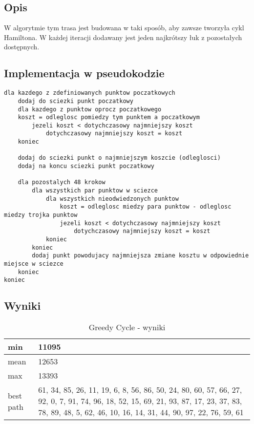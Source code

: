 \documentclass[a4paper 10pt]{article}
\begin{document}
\subsection{Opis}
W algorytmie tym trasa jest budowana w taki sposób, aby zawsze tworzyła cykl Hamiltona. W każdej iteracji dodawany jest jeden najkrótszy łuk z pozostałych dostępnych.
\subsection{Implementacja w pseudokodzie}
\begin{lstlisting}[frame=single]
dla kazdego z zdefiniowanych punktow poczatkowych
	dodaj do sciezki punkt poczatkowy
	dla kazdego z punktow oprocz poczatkowego
	koszt = odleglosc pomiedzy tym punktem a poczatkowym
		jezeli koszt < dotychczasowy najmniejszy koszt
			dotychczasowy najmniejszy koszt = koszt
	koniec
	
	dodaj do sciezki punkt o najmniejszym koszcie (odleglosci)
	dodaj na koncu sciezki punkt poczatkowy
	
	dla pozostalych 48 krokow
		dla wszystkich par punktow w sciezce
			dla wszystkich nieodwiedzonych punktow
				koszt = odleglosc miedzy para punktow - odleglosc miedzy trojka punktow
				jezeli koszt < dotychczasowy najmniejszy koszt
					dotychczasowy najmniejszy koszt = koszt
			koniec
		koniec
		dodaj punkt powodujacy najmniejsza zmiane kosztu w odpowiednie miejsce w sciezce
	koniec	
koniec

\end{lstlisting}
\subsection{Wyniki}
\begin{table}[H]
\center
\caption{Greedy Cycle - wyniki}
\label{Greedy Cycle - wyniki}
\begin{tabular}{|p{1cm}|p{14cm}|}
\hline
min       & 11095                                                                                                                                                                                                 \\ \hline
mean      & 12653                                                                                                                                                                                                 \\ \hline
max       & 13393                                                                                                                                                                                                 \\ \hline
best path & 61, 34, 85, 26, 11, 19, 6, 8, 56, 86, 50, 24, 80, 60, 57, 66, 27, 92, 0, 7, 91, 74, 96, 18, 52, 15, 69, 21, 93, 87, 17, 23, 37, 83, 78, 89, 48, 5, 62, 46, 10, 16, 14, 31, 44, 90, 97, 22, 76, 59, 61 \\ \hline
\end{tabular}
\end{table}
\end{document}
